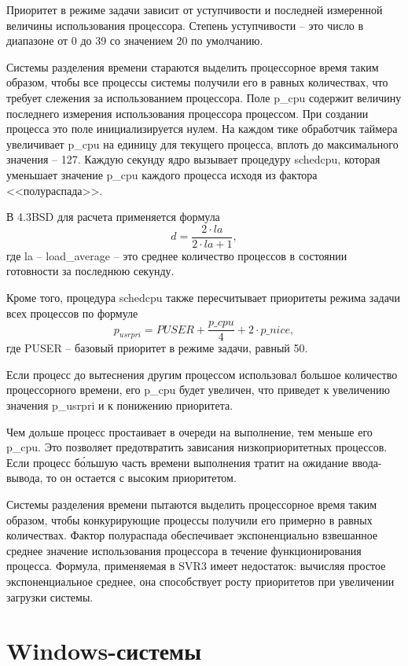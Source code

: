 Приоритет в режиме задачи зависит от уступчивости и последней измеренной величины использования процессора. Степень уступчивости -- это число в диапазоне от 0 до 39 со значением 20 по умолчанию. 

Системы разделения времени стараются выделить процессорное время таким образом, чтобы все процессы системы получили его в равных количествах, что требует слежения за использованием процессора. Поле {\ttfamily p{\_}cpu} содержит величину последнего измерения использования процессора процессом. При создании процесса это поле инициализируется нулем. На каждом тике обработчик таймера увеличивает {\ttfamily p{\_}cpu} на единицу для текущего процесса, вплоть до максимального значения -- 127. Каждую секунду ядро вызывает процедуру {\ttfamily schedcpu}, которая уменьшает значение {\ttfamily p{\_}cpu} каждого процесса исходя из фактора <<полураспада>>. 

В 4.3BSD для расчета применяется формула
\[
d = \frac{2\cdot la}{2\cdot la + 1},
\]
где {\ttfamily la} -- {\ttfamily load{\_}average} -- это среднее количество процессов в состоянии готовности за последнюю секунду.

Кроме того, процедура {\ttfamily schedcpu} также пересчитывает приоритеты режима задачи всех процессов по формуле
\[
{p_{usrpri}} = PUSER + \frac{p{\_}cpu}{4} + 2\cdot {p{\_}nice},
\]
где {\ttfamily PUSER} -- базовый приоритет в режиме задачи, равный 50.

Если процесс до вытеснения другим процессом использовал большое количество процессорного времени, его {\ttfamily p{\_}cpu} будет увеличен, что приведет к увеличению значения {\ttfamily p{\_}usrpri} и к понижению приоритета.

Чем дольше процесс простаивает в очереди на выполнение, тем меньше его {\ttfamily p{\_}cpu}. Это позволяет предотвратить зависания низкоприоритетных процессов. Если процесс б\'{о}льшую часть времени выполнения тратит на ожидание ввода-вывода, то он остается с высоким приоритетом.

Системы разделения времени пытаются выделить процессорное время таким образом, чтобы конкурирующие процессы получили его примерно в равных количествах. Фактор полураспада обеспечивает экспоненциально взвешанное среднее значение использования процессора в течение функционирования процесса. Формула, применяемая в SVR3 имеет недостаток: вычисляя простое экспоненциальное среднее, она способствует росту приоритетов при увеличении загрузки системы.

\section{Windows-системы}

